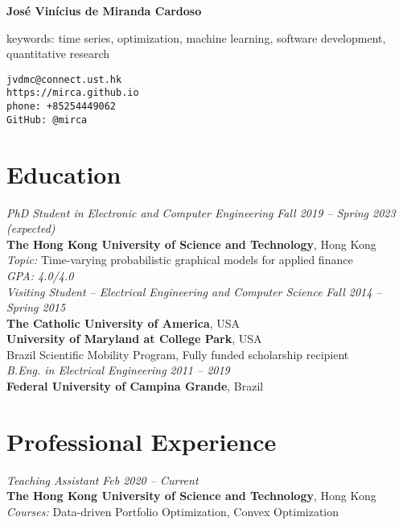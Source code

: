 \documentclass[10pt]{article}
\begin{document}
\pagestyle{empty}
\begin{titlepage}
     {\Large{\textbf{Jos\'e Vin\'icius de Miranda Cardoso}}}
     \vspace{.5cm}

    \begin{minipage}[b]{9cm}
      keywords: time series, optimization, machine learning, software development, quantitative research\\
    \end{minipage}
    \hfill
    \begin{minipage}[b]{4cm}
        \texttt{jvdmc@connect.ust.hk}\\
        \texttt{https://mirca.github.io}\\
        \texttt{phone: +85254449062}\\
        \texttt{GitHub: @mirca}
    \end{minipage}


\section*{Education}

\emph{PhD Student in Electronic and Computer Engineering} \hfill \textit{Fall 2019 -- Spring 2023 (expected)} \\
\textbf{The Hong Kong University of Science and Technology}, Hong Kong\\
\textit{Topic:} Time-varying probabilistic graphical models for applied finance\\
\textit{GPA: 4.0/4.0}\\

\emph{Visiting Student -- Electrical Engineering and Computer Science} \hfill \textit{Fall 2014 -- Spring 2015} \\
\textbf{The Catholic University of America}, USA\\
\textbf{University of Maryland at College Park}, USA \\
Brazil Scientific Mobility Program, Fully funded scholarship recipient \\

\emph{B.Eng. in Electrical Engineering} \hfill \textit{2011 -- 2019} \\
\textbf{Federal University of Campina Grande}, Brazil

\section*{Professional Experience}
\emph{Teaching Assistant} \hfill \textit{Feb 2020 -- Current}
\\ \textbf{The Hong Kong University of Science and Technology}, Hong Kong
\\ {\small\textit{Courses:} Data-driven Portfolio Optimization, Convex Optimization}
\vspace{.5cm}


\end{titlepage}
\end{document}
